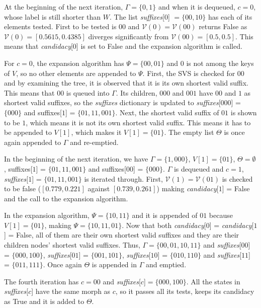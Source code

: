 {At the beginning of the next iteration, $\Gamma = \{0, 1\}$ and when it is dequeued, $c = 0$, whose label is still shorter than $W$. The list \textit{suffixes}[$0$] $= \{00, 10\}$ has each of its elements tested. First to be tested is $00$ and $\mathcal{V}(0) = \mathcal{V}(00)$ returns False as $\mathcal{V}(0) = [0.5615, 0.4385]$ diverges significantly from $\mathcal{V}(00) = [0.5, 0.5]$. This means that \textit{candidacy}[$0$] is set to False and the expansion algorithm is called.

For $c = 0$, the expansion algorithm has $\Psi = \{00, 01\}$ and $0$ is not among the keys of $V$, so no other elements are appended to $\Psi$. First, the SVS is checked for $00$ and by examining the tree, it is observed that it is its own shortest valid suffix. This means that $00$ is queued into $\Gamma$. Its children, $000$ and $001$ have $00$ and $1$ as shortest valid suffixes, so the \textit{suffixes} dictionary is updated to \textit{suffixes}[$000$] = $\{000\}$ and suffixes[$1$] = $\{01, 11, 001\}$. Next, the shortest valid suffix of $01$ is shown to be $1$, which means it is not its own shortest valid suffix. This means it has to be appended to $V[1]$, which makes it $V[1] = \{01\}$. The empty list $\Theta$ is once again appended to $\Gamma$ and re-emptied. 

In the beginning of the next iteration, we have $\Gamma = \{1, 000\}$, $V[1] = \{01\}$, $\Theta = \emptyset$, suffixes[$1$] = $\{01, 11, 001\}$ and suffixes[$00$] = $\{000\}$. $\Gamma$ is dequeued and $c = 1$, \textit{suffixes}[$1$] = $\{01, 11, 001\}$ is iterated through. First, $\mathcal{V}(1) = \mathcal{V}(01)$ is checked to be false ($[0.779, 0.221]$ against $[0.739, 0.261]$) making \textit{candidacy}[$1$] = False and the call to the expansion algorithm.

In the expansion algorithm, $\Psi = \{10, 11\}$ and it is appended of $01$ because $V[1] = \{01\}$, making $\Psi = \{10, 11, 01\}$. Now that both \textit{candidacy}[$0$] = \textit{candidacy}[$1$] = False, all of them are their own shortest valid suffixes and they are their children nodes' shortest valid suffixes. Thus, $\Gamma = \{00, 01, 10, 11\}$ and \textit{suffixes}[$00$] = $\{000, 100\}$, \textit{suffixes}[$01$] = $\{001, 101\}$, \textit{suffixes}[$10$] = $\{010, 110\}$ and \textit{suffixes}[$11$] = $\{011, 111\}$. Once again $\Theta$ is appended in $\Gamma$ and emptied.

The fourth iteration has $c = 00$ and \textit{suffixes}[$c$]$ = \{000, 100\}$. All the states in \textit{suffixes}[$c$] have the same morph as $c$, so it passes all its tests, keeps its candidacy as True and it is added to $\Theta$.

}
